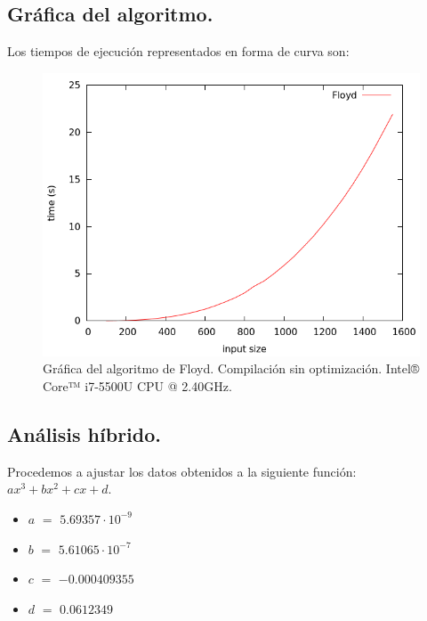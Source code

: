 \documentclass[11pt,a4paper]{article}
\begin{document}
		\subsection{Gráfica del algoritmo.}

			\par
			Los tiempos de ejecución representados en forma de curva son:

			\begin{figure}[h]

				\centering
				\includegraphics[width=1\textwidth]{floyd.png}
				\caption{Gráfica del algoritmo de Floyd. Compilación sin optimización. Intel® Core™ i7-5500U CPU @ 2.40GHz.}

			\end{figure}

		\subsection{Análisis híbrido.}

			\par
			Procedemos a ajustar los datos obtenidos a la siguiente función: $ax^3+bx^2+cx+d$.

			\begin{itemize}

					\item
					$a$ $=$ $5.69357\cdot 10^{-9}$
					\item
					$b$ $=$ $5.61065\cdot 10^{-7}$
					\item
					$c$ $=$ $-0.000409355$
					\item
					$d$ $=$ $0.0612349$

			\end{itemize}
\end{document}

